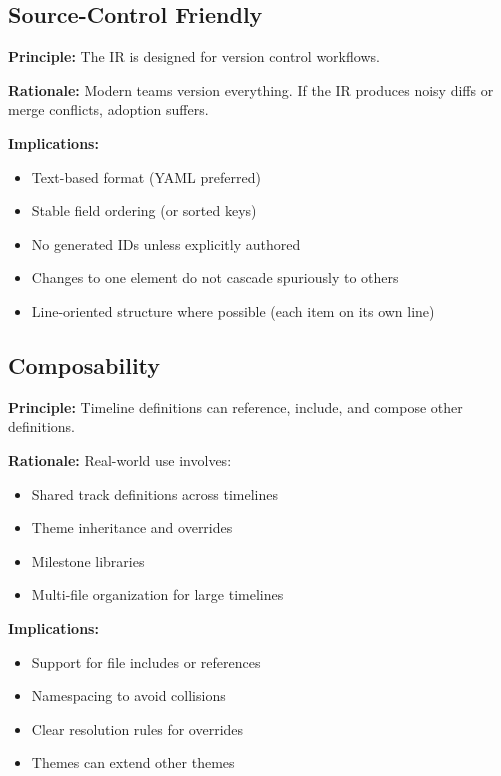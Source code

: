 \subsection{Source-Control Friendly}
\label{principle:vcs-friendly}

\textbf{Principle:} The IR is designed for version control workflows.

\textbf{Rationale:} Modern teams version everything. If the IR produces noisy diffs or merge conflicts, adoption suffers.

\textbf{Implications:}
\begin{itemize}
  \item Text-based format (YAML preferred)
  \item Stable field ordering (or sorted keys)
  \item No generated IDs unless explicitly authored
  \item Changes to one element do not cascade spuriously to others
  \item Line-oriented structure where possible (each item on its own line)
\end{itemize}

\subsection{Composability}
\label{principle:composability}

\textbf{Principle:} Timeline definitions can reference, include, and compose other definitions.

\textbf{Rationale:} Real-world use involves:
\begin{itemize}
  \item Shared track definitions across timelines
  \item Theme inheritance and overrides
  \item Milestone libraries
  \item Multi-file organization for large timelines
\end{itemize}

\textbf{Implications:}
\begin{itemize}
  \item Support for file includes or references
  \item Namespacing to avoid collisions
  \item Clear resolution rules for overrides
  \item Themes can extend other themes
\end{itemize}

